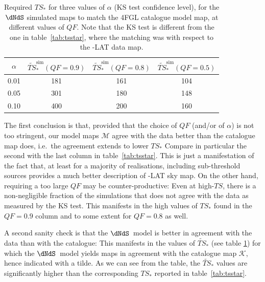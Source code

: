 \begin{table}[!h]
    \renewcommand{\arraystretch}{1.2}
    \centering
    \begin{tabular}{c|c|c|c}   
        $\alpha$ & $\widetilde{TS}_*^\textrm{sim}(QF=0.9)$& $\widetilde{TS}_*^\textrm{sim}(QF=0.8)$& $\widetilde{TS}_*^\textrm{sim}(QF=0.5)$\\
        \hline 
       0.01  & 181 & 161 & 104 \\ 
        \hline 
       0.05  & 301 & 180 &  148\\ 
        \hline 
       0.10  & 400 & 200 &  160\\
    \end{tabular}
\caption{Required $TS_*$ for three values of $\alpha$ (KS test confidence level), for the $\dNdS$ simulated maps to match the 4FGL catalogue model map, at different values of $QF$. Note that the KS test is different from the one in table~\ref{tab:tsstar}, where the matching was with respect to the \Fermi-LAT data map.}  
\label{tab:ts4FGL}
\end{table}
The first conclusion is that, provided that the choice of $QF$ (and/or  of $\alpha$) is not too stringent, 
 our model maps $\mathcal{M}$ agree with the data better than the catalogue map does, i.e.~the agreement extends to lower $TS_*$\: Compare in particular the second with the last column in table~\ref{tab:tsstar}. This is just a manifestation of the fact that, at least for a majority of realisations, including sub-threshold sources provides a much better description of \Fermi-LAT sky map. On the other hand, requiring a too large $QF$ may be counter-productive: Even at high-$TS$, there is a non-negligible fraction of the simulations that does not agree with the data as measured by the KS test.  This manifests in the high values of $TS_*$ found in the $QF=0.9$ column and to some extent for $QF=0.8$ as well.
%

A second sanity check is that  the $\dNdS$~model is better in agreement with the data than with the catalogue: This manifests in the values of $\widetilde{TS}_*$ (see table \ref{tab:ts4FGL}) for which the $\dNdS$~model yields maps in agreement  with the catalogue map $\mathcal{K}$, hence indicated with a tilde. As we can see from the table, the $\widetilde{TS}_*$ values are significantly higher than the corresponding $TS_*$ reported in table~\ref{tab:tsstar}.


